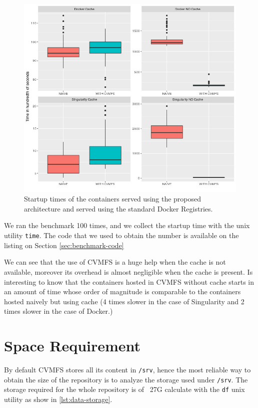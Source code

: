 \begin{figure}[]{}
    \includegraphics[width=\textwidth]{gfx/plot-startup-time}
        \caption{Startup times of the containers served using the proposed architecture and served using the standard Docker Registries.}
        \label{fig:startup-time}
\end{figure}


We ran the benchmark 100 times, and we collect the startup time with the unix
utility \texttt{time}. The code that we used to obtain the number is available
on the listing on Section \ref{sec:benchmark-code}

We can see that the use of CVMFS is a huge help when the cache is not
available, moreover its overhead is almost negligible when the cache is
present. Is interesting to know that the containers hosted in CVMFS without
cache starts in an amount of time whose order of magnitude is comparable to the
containers hosted naively but using cache (4 times slower in the case of
Singularity and 2 times slower in the case of Docker.)


\section{Space Requirement}

By default CVMFS stores all its content in \texttt{/srv}, hence the most
reliable way to obtain the size of the repository is to analyze the storage
used under \texttt{/srv}. The storage required for the whole repository is of
~27G calculate with the \texttt{df} unix utility as show in
\ref{lst:data-storage}.

